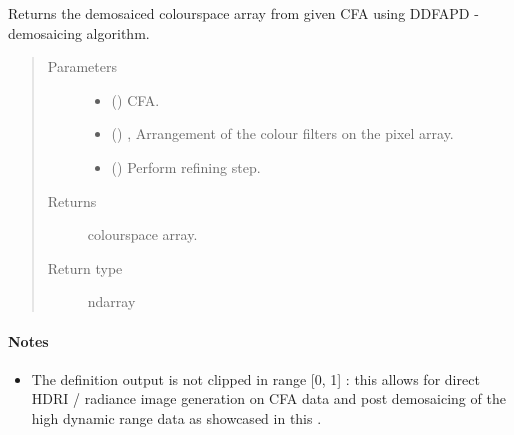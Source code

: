 \documentclass[letterpaper,10pt,english]{sphinxmanual}
\begin{document}
\begin{fulllineitems}
\label{\detokenize{generated/colour_demosaicing.demosaicing_CFA_Bayer_DDFAPD:colour_demosaicing.demosaicing_CFA_Bayer_DDFAPD}}
Returns the demosaiced  colourspace array from given  CFA using
DDFAPD -  demosaicing algorithm.
\begin{quote}\begin{description}
\item[{Parameters}] \leavevmode\begin{itemize}
\item {} 
 () \textendash{}  CFA.

\item {} 
 (\sphinxstyleliteralemphasis{, }) \textendash{} ,
Arrangement of the colour filters on the pixel array.

\item {} 
 () \textendash{} Perform refining step.

\end{itemize}

\item[{Returns}] \leavevmode
{} colourspace array.

\item[{Return type}] \leavevmode
ndarray

\end{description}\end{quote}
\paragraph{Notes}
\begin{itemize}
\item {} 
The definition output is not clipped in range {[}0, 1{]} : this allows for
direct HDRI / radiance image generation on  CFA data and post
demosaicing of the high dynamic range data as showcased in this
.


\end{itemize}
\end{fulllineitems}
\end{document}
